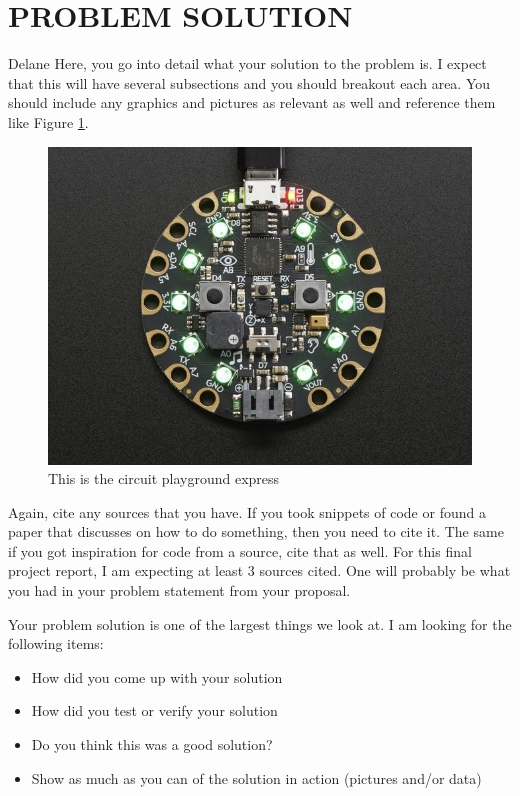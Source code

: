 \documentclass[12pt]{article}
\begin{document}
\section{PROBLEM SOLUTION}
Delane
Here, you go into detail what your solution to the problem is.  I expect that this will have several subsections and you should breakout each area.  You should include any graphics and pictures as relevant as well and reference them like Figure \ref{fig:cpx}.
\begin{figure}[!t]
\centering
\includegraphics[width=4.5in]{cpx01.jpg}
\caption{This is the circuit playground express}
\label{fig:cpx}
\end{figure}

Again, cite any sources that you have.  If you took snippets of code or found a paper that discusses on how to do something, then you need to cite it. The same if you got inspiration for code from a source, cite that as well. For this final project report, I am expecting at least 3 sources cited.  One will probably be what you had in your problem statement from your proposal.  

Your problem solution is one of the largest things we look at. I am looking for the following items:

\begin{itemize}
    \item How did you come up with your solution
    \item How did you test or verify your solution
    \item Do you think this was a good solution?
    \item Show as much as you can of the solution in action (pictures and/or data)
\end{itemize}
\end{document}
